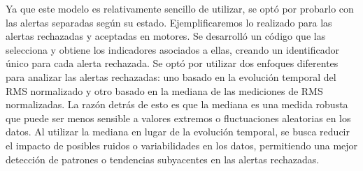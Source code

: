 \documentclass{article}[14pts]
\begin{document}
    Ya que este modelo es relativamente sencillo de utilizar, se optó por probarlo con las alertas separadas según su estado. Ejemplificaremos lo realizado para las alertas rechazadas y aceptadas en motores. Se desarrolló un código que las selecciona y obtiene los indicadores asociados a ellas, creando un identificador único para cada alerta rechazada. Se optó por utilizar dos enfoques diferentes para analizar las alertas rechazadas: uno basado en la evolución temporal del RMS normalizado y otro basado en la mediana de las mediciones de RMS normalizadas. La razón detrás de esto es que la mediana es una medida robusta que puede ser menos sensible a valores extremos o fluctuaciones aleatorias en los datos. Al utilizar la mediana en lugar de la evolución temporal, se busca reducir el impacto de posibles ruidos o variabilidades en los datos, permitiendo una mejor detección de patrones o tendencias subyacentes en las alertas rechazadas.
\end{document}
